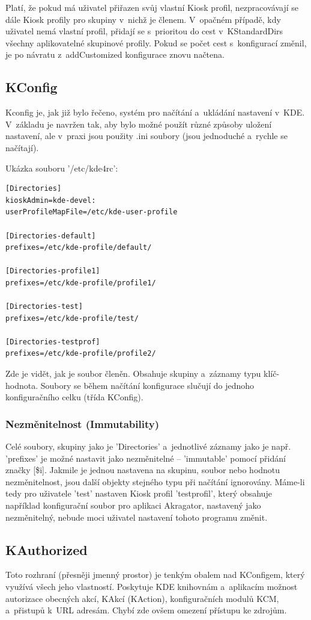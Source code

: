 Platí, že pokud má uživatel přiřazen svůj vlastní Kiosk profil, nezpracovávají
se dále Kiosk profily pro skupiny v~nichž je členem. V~opačném případě, kdy
uživatel nemá vlastní profil, přidají se s~prioritou do cest v~KStandardDirs
všechny aplikovatelné skupinové profily. Pokud se počet cest s~konfigurací
změnil, je po návratu z~addCustomized konfigurace znovu načtena.

\subsection{KConfig}
Kconfig je, jak již bylo řečeno, systém pro načítání a~ukládání nastavení v~KDE.
V~základu je navržen tak, aby bylo možné použít různé způsoby uložení nastavení,
ale v~praxi jsou použity .ini soubory (jsou jednoduché a~rychle se načítají).

Ukázka souboru '/etc/kde4rc':
\begin{verbatim}
[Directories]
kioskAdmin=kde-devel:
userProfileMapFile=/etc/kde-user-profile

[Directories-default]
prefixes=/etc/kde-profile/default/

[Directories-profile1]
prefixes=/etc/kde-profile/profile1/

[Directories-test]
prefixes=/etc/kde-profile/test/

[Directories-testprof]
prefixes=/etc/kde-profile/profile2/
\end{verbatim}
Zde je vidět, jak je soubor členěn. Obsahuje skupiny a~záznamy typu
klíč-hodnota. Soubory se během načítání konfigurace slučují do jednoho
konfiguračního celku
(třída KConfig).

\subsubsection{Nezměnitelnost (Immutability)}
Celé soubory, skupiny jako je 'Directories' a~jednotlivé záznamy jako je např.
'prefixes' je možné nastavit jako nezměnitelné -- 'immutable' pomocí přidání
značky [\$i].
Jakmile je jednou nastavena na skupinu, soubor nebo hodnotu nezměnitelnost, jsou
další objekty stejného typu při načítání ignorovány. Máme-li tedy pro uživatele
'test' nastaven Kiosk profil 'testprofil', který obsahuje například konfigurační
soubor pro aplikaci Akragator, nastavený jako nezměnitelný, nebude moci uživatel
nastavení tohoto programu změnit.

\subsection{KAuthorized}
Toto rozhraní (přesněji jmenný prostor) je tenkým obalem nad KConfigem, který
využívá všech jeho vlastností. Poskytuje KDE knihovnám a~aplikacím možnost
autorizace obecných akcí, KAkcí (KAction), konfiguračních modulů KCM, a~přistupů
k~URL adresám.
Chybí zde ovšem omezení přístupu ke zdrojům.

